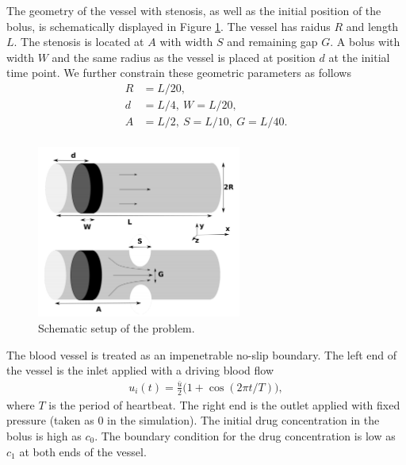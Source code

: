 The geometry of the vessel with stenosis, as well as the initial position of the bolus, is schematically displayed in Figure \ref{fig:stenosis}. The vessel has raidus $R$ and length $L$. The stenosis is located at $A$ with width $S$ and remaining gap $G$. A bolus with width $W$ and the same radius as the vessel is placed at position $d$ at the initial time point. We further constrain these geometric parameters as follows
\begin{align}
    R&=L/20,\\
    d&=L/4,~W=L/20,\\
    A&=L/2,~S=L/10,~G=L/40.\\
\end{align}
\begin{figure}[htbp]
    \centering
    \includegraphics[width=0.6\textwidth]{YiqiXie/stenosis.png}
    \caption{Schematic setup of the problem.}
    \label{fig:stenosis}
\end{figure}

The blood vessel is treated as an impenetrable no-slip boundary. The left end of the vessel is the inlet applied with a driving blood flow
\begin{align}
    u_i(t)=\frac{\bar{u}}{2}\big(1+\cos(2\pi t/T)\big), 
\end{align}
where $T$ is the period of heartbeat. The right end is the outlet applied with fixed pressure (taken as 0 in the simulation). The initial drug concentration in the bolus is high as $c_0$. The boundary condition for the drug concentration is low as $c_1$ at both ends of the vessel. 

